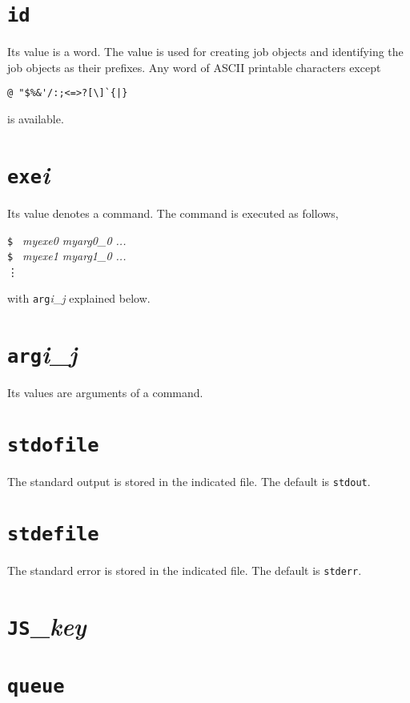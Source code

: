 \documentclass[a4paper,10pt]{report}
\begin{document}
\section{\texttt{id}}

Its value is a word.  The value is used for creating job objects and
identifying the job objects as their prefixes.  Any word of ASCII
printable characters except
\begin{center}
\verb*+@ "$%&'/:;<=>?[\]`{|}+        %
\end{center}
is available.

\section{\texttt{exe}\textit{i}}

Its value denotes a command.  The command is executed as follows,
\begin{screen}
\texttt{\$ } \textit{myexe0 myarg0\_0 ...}\\
\texttt{\$ } \textit{myexe1 myarg1\_0 ...}\\
\vdots
\end{screen}
with \texttt{arg}\textit{i}\_\textit{j} explained below.

\section{\texttt{arg}\textit{i}\_\textit{j}}

Its values are arguments of a command.

\section{\texttt{stdofile}}

The standard output is stored in the indicated file.
The default is \texttt{stdout}.

\section{\texttt{stdefile}}

The standard error is stored in the indicated file.
The default is \texttt{stderr}.

\section{\texttt{JS}\_\textit{key}}

\section{\texttt{queue}}
\end{document}

